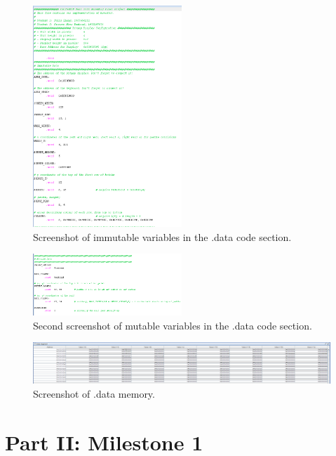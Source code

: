 \documentclass{article}
\begin{document}
\begin{enumerate}
\begin{figure}[ht!]
    \centering
    \includegraphics[width=0.5\textwidth]{memory2.png}
    \caption{Screenshot of immutable variables in the .data code section.}
    \label{f:part1_memory1}
\end{figure}

\begin{figure}[ht!]
    \centering
    \includegraphics[width=0.5\textwidth]{memory3.png}
    \caption{Second screenshot of mutable variables in the .data code section.}
    \label{f:part1_memory2}
\end{figure}

\begin{figure}[ht!]
    \centering
    \includegraphics[width=\textwidth]{memory1.png}
    \caption{Screenshot of .data memory.}
    \label{f:part1_memory3}
\end{figure}

\clearpage
\section{Part II: Milestone 1}


\end{enumerate}
\end{document}
